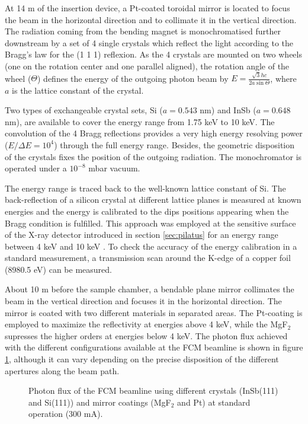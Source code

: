At 14 m of the insertion device, a Pt-coated toroidal mirror is located to focus the beam in the horizontal direction and to collimate it in the vertical direction. The radiation coming from the bending magnet is monochromatised further downstream by a set of 4 single crystals which reflect the light according to the Bragg's law for the (1 1 1) reflexion. As the 4 crystals are mounted on two wheels (one on the rotation center and one parallel aligned), the rotation angle of the wheel ($\Theta$) defines the energy of the outgoing photon beam by $E=\frac{\sqrt{3}h c}{2a\sin{\Theta}}$, where $a$ is the lattice constant of the crystal.

Two types of exchangeable crystal sets, Si ($a=0.543$ nm) and InSb ($a=0.648$ nm), are available to cover the energy range from 1.75 keV to 10 keV. The convolution of the 4 Bragg reflections provides a very high energy resolving power ($E/\Delta E = 10^4 $) through the full energy range. Besides, the geometric disposition of the crystals fixes the position of the outgoing radiation. The monochromator is operated under a $10^{-8}$ mbar vacuum.

The energy range is traced back to the well-known lattice constant of Si. The back-reflection of a silicon crystal at different lattice planes is measured at known energies and the energy is calibrated to the dips positions appearing when the Bragg condition is fulfilled. This approach was employed at the sensitive surface of the X-ray detector introduced in section \ref{sec:pilatus} for an energy range between 4 keV and 10 keV \citep{gollwitzer_diffraction_2014}. To check the accuracy of the energy calibration in a standard measurement, a transmission scan around the K-edge of a copper foil (8980.5 eV) can be measured.

About 10 m before the sample chamber, a bendable plane mirror collimates the beam in the vertical direction and focuses it in the horizontal direction. The mirror is coated with two different materials in separated areas. The Pt-coating is employed to maximize the reflectivity at energies above 4 keV, while the MgF$_2$ supresses the higher orders at energies below 4 keV. The photon flux achieved with the different configurations available at the FCM beamline is shown in figure \ref{fig:FCMBeamlineFlux}, although it can vary depending on the precise disposition of the different apertures along the beam path.

\begin{figure}%
	\centering
		
		\caption{Photon flux of the FCM beamline using different crystals (InSb(111) and Si(111)) and mirror coatings (MgF$_2$ and Pt) at standard operation (300 mA).}
		\label{fig:FCMBeamlineFlux}
\end{figure}

